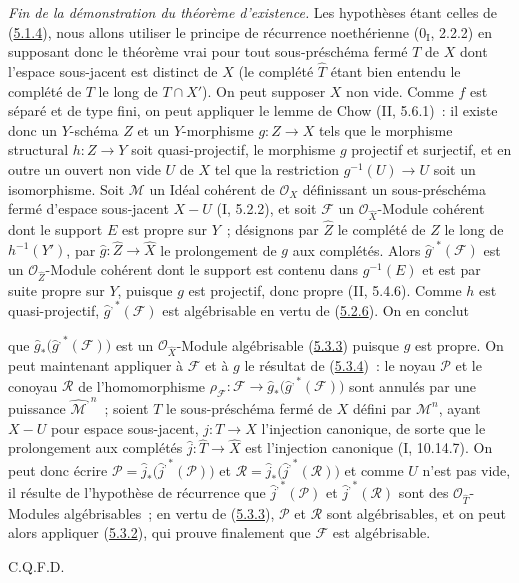 \begin{env}[5.3.5]
\label{III.5.3.5-fr}
\emph{Fin de la démonstration du théorème d'existence.}
Les hypothèses étant celles de (\hyperref[III.5.1.4-fr]{5.1.4}), nous allons
utiliser le principe de récurrence noethérienne ($0_{\mathrm I}$, 2.2.2) en supposant
donc le théorème vrai pour tout sous-préschéma fermé $T$ de $X$ dont l'espace
sous-jacent est distinct de $X$ (le complété $\widehat T$ étant bien entendu le
complété de $T$ le long de $T\cap X'$). On peut supposer $X$ non vide. Comme $f$
est séparé et de type fini, on peut appliquer le lemme de Chow (II, 5.6.1)~: il
existe donc un $Y$-schéma $Z$ et un $Y$-morphisme $g:Z\to X$ tels que le morphisme
structural $h:Z\to Y$ soit quasi-projectif, le morphisme $g$ projectif et surjectif,
et en outre un ouvert non vide $U$ de $X$ tel que la restriction
$g^{-1}(U)\to U$ soit un isomorphisme. Soit $\mathcal M$ un Idéal cohérent de
$\mathcal O_X$ définissant un sous-préschéma fermé d'espace sous-jacent $X-U$
(I, 5.2.2), et soit $\mathcal F$ un $\mathcal O_{\widehat X}$-Module cohérent dont
le support $E$ est propre sur $Y$~; désignons par $\widehat Z$ le complété de $Z$
le long de $h^{-1}(Y')$, par $\widehat g:\widehat Z\to\widehat X$ le prolongement
de $g$ aux complétés. Alors $\widehat g^{,*}(\mathcal F)$ est un
$\mathcal O_{\widehat Z}$-Module cohérent dont le support est contenu dans
$g^{-1}(E)$ et est par suite propre sur $Y$, puisque $g$ est projectif, donc propre
(II, 5.4.6). Comme $h$ est quasi-projectif, $\widehat g^{,*}(\mathcal F)$ est
algébrisable en vertu de (\hyperref[III.5.2.6-fr]{5.2.6}). On en conclut


que $\widehat g_*\bigl(\widehat g^{,*}(\mathcal F)\bigr)$ est un
$\mathcal O_{\widehat X}$-Module algébrisable
(\hyperref[III.5.3.3-fr]{5.3.3}) puisque $g$ est propre. On peut maintenant
appliquer à $\mathcal F$ et à $g$ le résultat de
(\hyperref[III.5.3.4-fr]{5.3.4})~: le noyau $\mathcal P$ et le conoyau
$\mathcal R$ de l'homomorphisme
$\rho_{\mathcal F}:\mathcal F\to
\widehat g_*\bigl(\widehat g^{,*}(\mathcal F)\bigr)$ sont annulés par une
puissance $\widehat{\mathcal M}^{,n}$~; soient $T$ le sous-préschéma fermé de $X$
défini par $\mathcal M^n$, ayant $X-U$ pour espace sous-jacent,
$j:T\to X$ l'injection canonique, de sorte que le prolongement aux complétés
$\widehat j:\widehat T\to\widehat X$ est l'injection canonique (I, 10.14.7). On
peut donc écrire
$\mathcal P=\widehat j_*\bigl(\widehat j^{,*}(\mathcal P)\bigr)$ et
$\mathcal R=\widehat j_*\bigl(\widehat j^{,*}(\mathcal R)\bigr)$ et comme $U$
n'est pas vide, il résulte de l'hypothèse de récurrence que
$\widehat j^{,*}(\mathcal P)$ et $\widehat j^{,*}(\mathcal R)$ sont des
$\mathcal O_{\widehat T}$-Modules algébrisables~; en vertu de
(\hyperref[III.5.3.3-fr]{5.3.3}), $\mathcal P$ et $\mathcal R$ sont
algébrisables, et on peut alors appliquer (\hyperref[III.5.3.2-fr]{5.3.2}), qui
prouve finalement que $\mathcal F$ est algébrisable.

\hfill C.Q.F.D.
\end{env}

